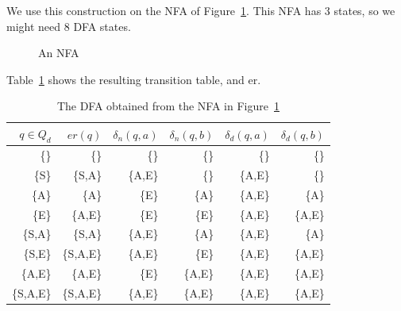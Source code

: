 We use this construction on the NFA of Figure~\ref{fsa2}. This NFA
has 3 states, so we might need 8 DFA states.


\begin{figure}[h]
\caption{An NFA \label{fsa2}}
\end{figure}


Table~\ref{charstable} shows the resulting transition table, and er.

\begin{table}[ht]
\center
\begin{tabular}{|r|r|r|r|r|r|}
\hline
$q \in Q_d$    & $er(q)$  &  $\delta_n(q,a) $ & $\delta_n(q,b) $ & $\delta_d(q,a)$ & $\delta_d(q,b)$ \\ \hline
\{\}           & \{\}     &  \{\}             & \{\}             & \{\}            & \{\}            \\
\{S\}          & \{S,A\}  &  \{A,E\}          & \{\}             & \{A,E\}         & \{\}            \\
\{A\}          & \{A\}    &  \{E\}            & \{A\}            & \{A,E\}         & \{A\}           \\
\{E\}          & \{A,E\}  &  \{E\}            & \{E\}            & \{A,E\}         & \{A,E\}         \\
\{S,A\}        & \{S,A\}  &  \{A,E\}          & \{A\}            & \{A,E\}         & \{A\}           \\
\{S,E\}        & \{S,A,E\}&  \{A,E\}          & \{E\}            & \{A,E\}         & \{A,E\}         \\
\{A,E\}        & \{A,E\}  &  \{E\}            & \{A,E\}          & \{A,E\}         & \{A,E\}         \\
\{S,A,E\}      & \{S,A,E\}&  \{A,E\}          & \{A,E\}          & \{A,E\}         & \{A,E\}         \\
\hline
\end{tabular}
\caption{The DFA obtained from the NFA in Figure~\ref{fsa2}} \label{charstable}
\end{table}


